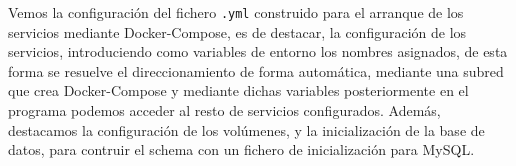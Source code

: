 Vemos la configuración del fichero {\tt .yml} construido para el arranque
de los servicios mediante Docker-Compose, es de destacar, la configuración
de los servicios, introduciendo como variables de entorno los nombres
asignados, de esta forma se resuelve el direccionamiento de forma
automática, mediante una subred que crea Docker-Compose y mediante dichas
variables posteriormente en el programa podemos acceder al resto de
servicios configurados. Además, destacamos la configuración de los
volúmenes, y la inicialización de la base de datos, para contruir el schema
con un fichero de inicialización para MySQL.


